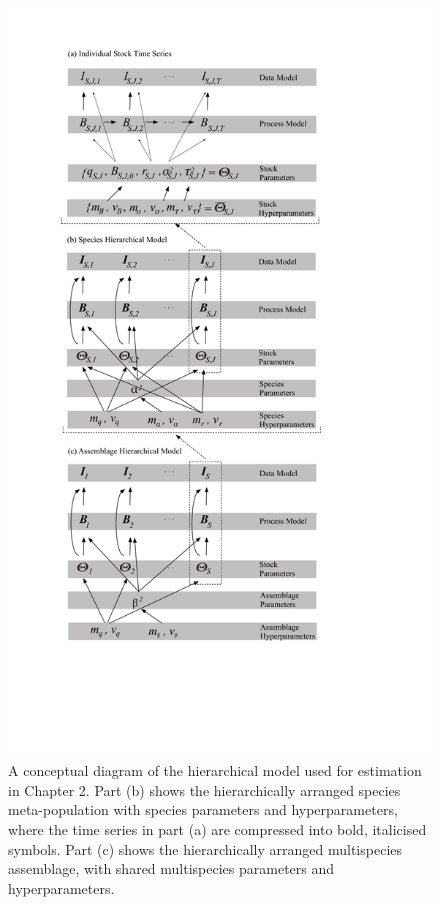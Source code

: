 \documentclass[]{scrartcl}
\begin{document}
\begin{figure}[htbp]
\centering
\includegraphics[scale = 0.4]{figures/HBMClarkCh2.pdf}
\caption{A conceptual diagram of the hierarchical model used for estimation in Chapter 2. Part (b) shows the hierarchically arranged species meta-population with species parameters and hyperparameters, where the time series in part (a) are compressed into bold, italicised symbols. Part (c) shows the hierarchically arranged multispecies assemblage, with shared multispecies parameters and hyperparameters.}\label{fig:HBMCh2}
\end{figure}
\end{document}
